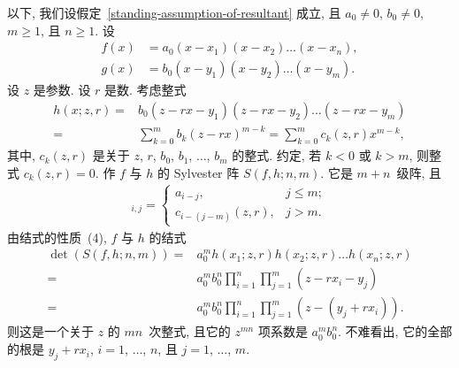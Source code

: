 \documentclass[../libro.tex]{subfiles}
\begin{document}
以下, 我们设假定~\ref{standing-assumption-of-resultant} 成立,
且 \(a_0 \neq 0\), \(b_0 \neq 0\),
\(m \geq 1\), 且 \(n \geq 1\).
设
\begin{align*}
    f(x) & = a_0 (x - x_1) (x - x_2) \dots (x - x_n), \\
    g(x) & = b_0 (x - y_1) (x - y_2) \dots (x - y_m).
\end{align*}
设 \(z\) 是参数.
设 \(r\) 是数.
考虑整式
\begin{align*}
    h(x; z, r)
    = {} &
    b_0 (z - r x - y_1) (z - r x - y_2) \dots
    (z - r x - y_m)
    \\
    = {} &
    \sum_{k = 0}^{m} {b_k (z - r x)^{m-k}}
    =
    \sum_{k = 0}^{m} {c_k (z, r) x^{m-k}},
\end{align*}
其中, \(c_k (z, r)\) 是关于
\(z\), \(r\), \(b_0\), \(b_1\), \(\dots\), \(b_m\)
的整式.
约定, 若 \(k < 0\) 或 \(k > m\),
则整式 \(c_k (z, r) = 0\).
作 \(f\) 与 \(h\) 的 Sylvester 阵 \(S(f, h; n, m)\).
它是 \(m + n\)~级阵, 且
\begin{align*}
    [S(f, h; n, m)]_{i,j} =
    \begin{cases}
        a_{i-j},            & j \leq m; \\
        c_{i-(j-m)} (z, r), & j > m.
    \end{cases}
\end{align*}
由结式的性质~(4), \(f\) 与 \(h\) 的结式
\begin{align*}
    \det {(S(f, h; n, m))}
    = {} &
    a_0^m h(x_1; z, r) h(x_2; z, r) \dots h(x_n; z, r)
    \\
    = {} &
    a_0^m b_0^n
    \prod_{i = 1}^{n} \prod_{j = 1}^{m}
    {(z - r x_i - y_j)}
    \\
    = {} &
    a_0^m b_0^n
    \prod_{i = 1}^{n} \prod_{j = 1}^{m}
    {(z - (y_j + r x_i))}.
\end{align*}
则这是一个关于 \(z\) 的 \(m n\)~次整式,
且它的 \(z^{m n}\) 项系数是 \(a_0^m b_0^n\).
不难看出, 它的全部的根是 \(y_j + r x_i\),
\(i = 1\), \(\dots\), \(n\),
且 \(j = 1\), \(\dots\), \(m\).
\end{document}
